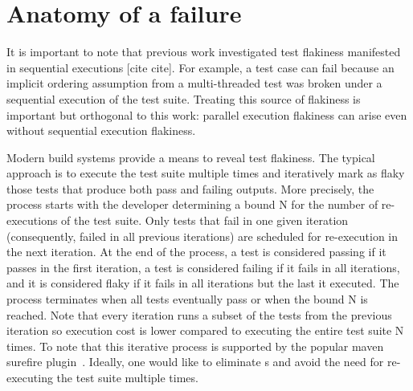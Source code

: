 \section{Anatomy of a \pef{} failure}


It is important to note that previous work investigated test flakiness
manifested in sequential executions [cite cite].  For example, a test
case can fail because an implicit ordering assumption from a
multi-threaded test was broken under a sequential execution of the
test suite.   Treating this source of
flakiness is important but orthogonal to this work: parallel execution
flakiness can arise even without sequential execution flakiness.

Modern build systems provide a means to reveal test flakiness.  The
typical approach is to execute the test suite multiple times and
iteratively mark as flaky those tests that produce both pass and
failing outputs.  More precisely, the process starts with the
developer determining a bound N for the number of re-executions of the
test suite.  Only tests that fail in one given iteration
(consequently, failed in all previous iterations) are scheduled for
re-execution in the next iteration.  At the end of the process, a test
is considered passing if it passes in the first iteration, a test is
considered failing if it fails in all iterations, and it is considered
flaky if it fails in all iterations but the last it executed.  The
process terminates when all tests eventually pass or when the bound N
is reached.  Note that every iteration runs a subset of the tests from
the previous iteration so execution cost is lower compared to
executing the entire test suite N times.  To note that this iterative
process is supported by the popular maven surefire
plugin~\cite{maven-surefire-plugin}.  Ideally, one would like to eliminate \pef{}s and
avoid the need for re-executing the test suite multiple times.
